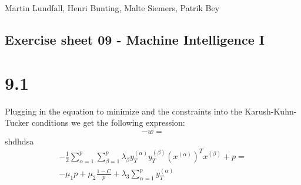 \documentclass[11pt,a4paper]{article}
\begin{document}
\noindent
Martin Lundfall, Henri Bunting, Malte Siemers, Patrik Bey
\begin{centering}
  \section*{Exercise sheet 09 - Machine Intelligence I}
  \end{centering}
\section*{9.1}

Plugging in the equation to minimize and the constraints into the Karush-Kuhn-Tucker conditions we get the following expression:
\begin{equation}
\begin{split}
- w = 
\end{split}
\end{equation}
shdhdsa
\begin{equation}
\begin{split}
-\frac{1}{2} \sum_{\alpha=1}^p\sum_{\beta=1}^p\lambda_{\beta}y_T^{(\alpha)}y_T^{(\beta)}\left( x^{(\alpha)} \right ) ^T x^{(\beta)}+p = \\
- \mu_1 p + \mu_2 \frac{1-C}{p} + \lambda_3 \sum_{\alpha=1}^p y_T^{(\alpha)}
\end{split}
\end{equation}
\end{document}
